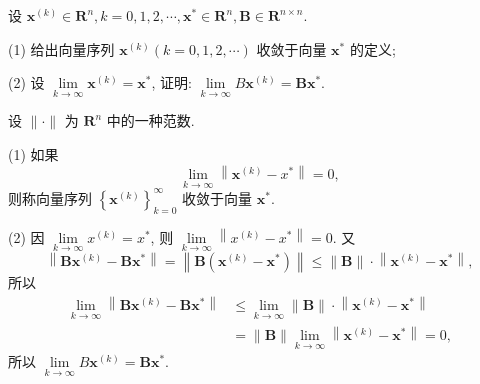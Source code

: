 \documentclass[a4paper,fontsize=8pt]{kaobook}
\begin{document}
\begin{tcolorbox}[enhanced,colback=gray!5,colframe=gray!75,breakable,coltitle=green!25!black,title=2024]
 设 $ \boldsymbol{x}^{(k)} \in \mathbf{R}^{n}, k=0,1,2, \cdots, \boldsymbol{x}^{*} \in \mathbf{R}^{n}, \boldsymbol{B} \in \mathbf{R}^{n \times n} $.

(1) 给出向量序列 $ \boldsymbol{x}^{(k)}(k=0,1,2, \cdots) $ 收敛于向量 $ \boldsymbol{x}^{*} $ 的定义;

(2) 设 $ \lim\limits _{k \rightarrow \infty} \boldsymbol{x}^{(k)}=\boldsymbol{x}^{*} $, 证明: $ \lim\limits _{k \rightarrow \infty} B \boldsymbol{x}^{(k)}=\boldsymbol{B} \boldsymbol{x}^{*} $.

 \tcblower

设 $ \|\cdot\| $ 为 $ \mathbf{R}^{n} $ 中的一种范数.

(1) 如果
$$
\lim _{k \rightarrow \infty}\left\|\boldsymbol{x}^{(k)}-x^{*}\right\|=0,
$$
则称向量序列 $ \left\{\boldsymbol{x}^{(k)}\right\}_{k=0}^{\infty} $ 收敛于向量 $ \boldsymbol{x}^{*} $.

(2) 因 $ \lim\limits _{k \rightarrow \infty} x^{(k)}=x^{*} $, 则 $ \lim\limits _{k \rightarrow \infty}\left\|x^{(k)}-x^{*}\right\|=0 $. 又
$$
\left\|\boldsymbol{B} \boldsymbol{x}^{(k)}-\boldsymbol{B} \boldsymbol{x}^{*}\right\|=\left\|\boldsymbol{B}\left(\boldsymbol{x}^{(k)}-\boldsymbol{x}^{*}\right)\right\| \leqslant\|\boldsymbol{B}\| \cdot\left\|\boldsymbol{x}^{(k)}-\boldsymbol{x}^{*}\right\|,
$$
所以
$$
\begin{aligned}
\lim _{k \rightarrow \infty}\left\|\boldsymbol{B} \boldsymbol{x}^{(k)}-\boldsymbol{B} \boldsymbol{x}^{*}\right\| & \leqslant \lim _{k \rightarrow \infty}\|\boldsymbol{B}\| \cdot\left\|\boldsymbol{x}^{(k)}-\boldsymbol{x}^{*}\right\| \\
& =\|\boldsymbol{B}\| \lim _{k \rightarrow \infty}\left\|\boldsymbol{x}^{(k)}-\boldsymbol{x}^{*}\right\|=0,
\end{aligned}
$$
所以 $ \lim\limits _{k \rightarrow \infty} B \boldsymbol{x}^{(k)}=\boldsymbol{B} \boldsymbol{x}^{*} $.

\end{tcolorbox}
\end{document}
